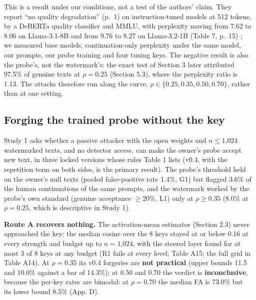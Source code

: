 \documentclass[11pt,letterpaper]{article}
\begin{document}
This is a result under our conditions, not a test of the authors' claim. They report ``no quality degradation'' (p.~1) on instruction-tuned models at 512 tokens, by a DeBERTa quality classifier and MMLU, with perplexity moving from 7.62 to 8.06 on Llama-3.1-8B and from 9.76 to 8.27 on Llama-3.2-1B (Table 7, p.~15) \citep{ardoin2026selfrecognition}; we measured base models, continuation-only perplexity under the same model, our prompts, our probe training and four tuning keys. The negative result is also the probe's, not the watermark's: the exact test of Section 3 later attributed 97.5\% of genuine texts at \(\rho = 0.25\) (Section 5.3), where the perplexity ratio is 1.13. The attacks therefore run along the curve, \(\rho \in \{0.25, 0.35, 0.50, 0.70\}\), rather than at one setting.

\hypertarget{forging-the-trained-probe-without-the-key}{%
\subsection{Forging the trained probe without the key}\label{forging-the-trained-probe-without-the-key}}

Study 1 asks whether a passive attacker with the open weights and \(n \leq \text{1,024}\) watermarked texts, and no detector access, can make the owner's probe accept new text, in three locked versions whose rules Table 1 lists (v0.4, with the repetition term on both sides, is the primary result). The probe's threshold held on the owner's null texts (pooled false-positive rate 1.4\%, G1) but flagged 3.6\% of the human continuations of the same prompts, and the watermark worked by the probe's own standard (genuine acceptance \(\geq 20\)\%, L1) only at \(\rho \geq 0.35\) (8.0\% at \(\rho = 0.25\), which is descriptive in Study 1).

\textbf{Route A recovers nothing.} The activation-mean estimator (Section 2.3) never approached the key: the median cosine over the 8 keys stayed at or below 0.16 at every strength and budget up to \(n = \text{1,024}\), with the steered layer found for at most 3 of 8 keys at any budget (R1 fails at every level; Table A15; the full grid in Table A14). At \(\rho = 0.35\) its v0.4 forgeries are \textbf{not practical} (upper bounds 11.5 and 10.0\% against a bar of 14.3\%); at 0.50 and 0.70 the verdict is \textbf{inconclusive}, because the per-key rates are bimodal: at \(\rho = 0.70\) the median FA is 73.0\% but its lower bound 8.5\% (App. D).
\end{document}
